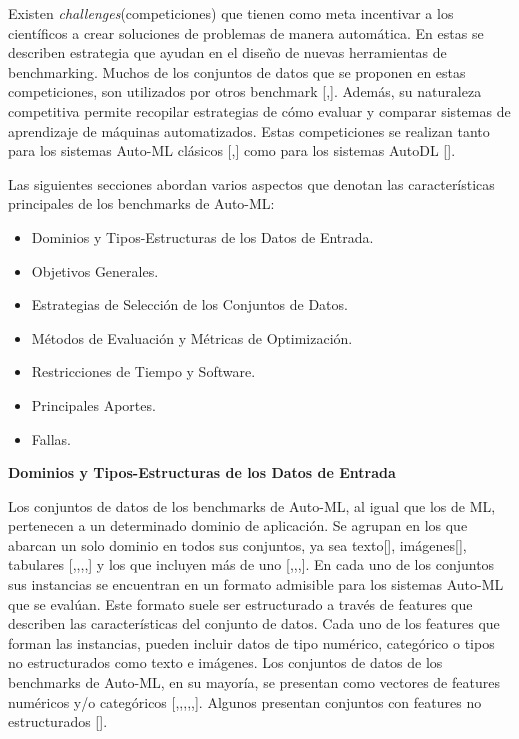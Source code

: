 Existen \textit{challenges}(competiciones) que tienen como meta incentivar a los científicos a crear soluciones de problemas de manera automática. 
En estas se describen estrategia que ayudan en el diseño de nuevas herramientas de benchmarking. Muchos de los conjuntos de datos que se proponen en estas competiciones, son 
utilizados por otros benchmark [\cite{15},\cite{14}]. 
Además, su naturaleza competitiva permite recopilar estrategias de cómo evaluar y comparar sistemas de aprendizaje de máquinas automatizados.
Estas competiciones se realizan tanto para los sistemas Auto-ML clásicos [\cite{11},\cite{12}] como para los sistemas AutoDL [\cite{29}].

Las siguientes secciones abordan varios aspectos que denotan las características principales de los benchmarks de Auto-ML:

\begin{itemize}
    \item Dominios y Tipos-Estructuras de los Datos de Entrada.
    \item Objetivos Generales.
    \item Estrategias de Selección de los Conjuntos de Datos.
    \item Métodos de Evaluación y Métricas de Optimización. 
    \item Restricciones de Tiempo y Software.
    \item Principales Aportes.
    \item Fallas. 
    \end{itemize} 

    \begin{flushleft} 
        {\large { \textbf{Dominios y Tipos-Estructuras de los Datos de Entrada}}}\label{subsection:dom Auto-ML}
\end{flushleft}

Los conjuntos de datos de los benchmarks de Auto-ML, al igual que los de ML, pertenecen a un determinado dominio de aplicación. Se agrupan en los que abarcan un 
solo dominio en todos sus conjuntos, ya sea texto[\cite{20}], imágenes[\cite{23}], tabulares [\cite{14},\cite{25},\cite{26},\cite{30},\cite{32}] y los que incluyen más 
de uno [\cite{10},\cite{31},\cite{26},\cite{16}]. 
En cada uno de los conjuntos sus instancias se encuentran en un formato admisible para los sistemas Auto-ML que se evalúan. 
Este formato suele ser estructurado a través de features que describen las características del conjunto de datos. 
Cada uno de los features que forman las instancias, pueden incluir datos de tipo numérico, categórico o tipos no estructurados 
como texto e imágenes. Los conjuntos de datos de los benchmarks de Auto-ML, en su mayoría, se presentan como vectores de features numéricos y/o categóricos 
[\cite{10},\cite{15},\cite{31},\cite{11},\cite{18},\cite{19}]. Algunos presentan conjuntos con features no estructurados [\cite{27}].

